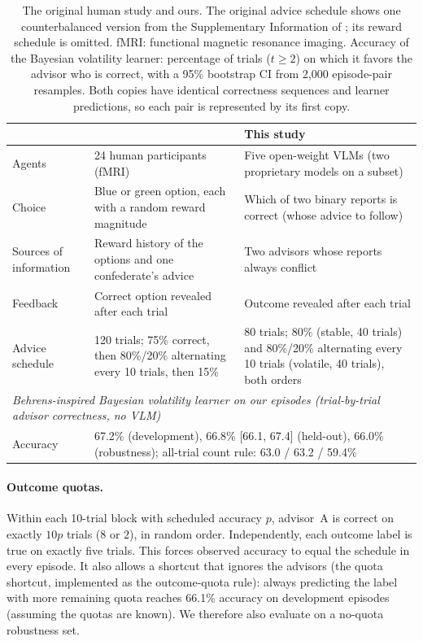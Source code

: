 \documentclass[letterpaper]{article} %
\begin{document}
\begin{table}[!t]\centering\small
  \setlength{\tabcolsep}{4pt}
  \begin{tabular}{p{}p{}p{}}
    \toprule
    & \citet{behrens2008associative} & This study \\
    \midrule
    Agents & 24 human participants (fMRI) & Five open-weight VLMs (two proprietary models on a subset) \\
    Choice & Blue or green option, each with a random reward magnitude & Which of two binary reports is correct (whose advice to follow) \\
    Sources of information & Reward history of the options and one confederate's advice & Two advisors whose reports always conflict \\
    Feedback & Correct option revealed after each trial & Outcome revealed after each trial \\
    Advice schedule & 120 trials; 75\% correct, then 80\%/20\% alternating every 10 trials, then 15\% & 80 trials; 80\% (stable, 40 trials) and 80\%/20\% alternating every 10 trials (volatile, 40 trials), both orders \\
    \midrule
    \multicolumn{3}{l}{\textit{Behrens-inspired Bayesian volatility learner on our episodes (trial-by-trial advisor correctness, no VLM)}} \\
    Accuracy & \multicolumn{2}{p{0.72\textwidth}}{67.2\% (development), 66.8\% [66.1, 67.4] (held-out), 66.0\% (robustness); all-trial count rule: 63.0 / 63.2 / 59.4\%} \\
    \bottomrule
  \end{tabular}
  \caption{The original human study and ours. The original advice schedule shows one counterbalanced version from the Supplementary Information of \citet{behrens2008associative}; its reward schedule is omitted. fMRI: functional magnetic resonance imaging. Accuracy of the Bayesian volatility learner: percentage of trials ($t\ge 2$) on which it favors the advisor who is correct, with a 95\% bootstrap CI from 2{,}000 episode-pair resamples. Both copies have identical correctness sequences and learner predictions, so each pair is represented by its first copy.}
  \label{tab:behrens}
\end{table}

\paragraph{Outcome quotas.} Within each 10-trial block with scheduled accuracy $p$, advisor~A is correct on exactly $10p$ trials ($8$ or $2$), in random order. Independently, each outcome label is true on exactly five trials. This forces observed accuracy to equal the schedule in every episode. It also allows a shortcut that ignores the advisors (the quota shortcut, implemented as the outcome-quota rule): always predicting the label with more remaining quota reaches 66.1\% accuracy on development episodes (assuming the quotas are known). We therefore also evaluate on a no-quota robustness set.
\end{document}
